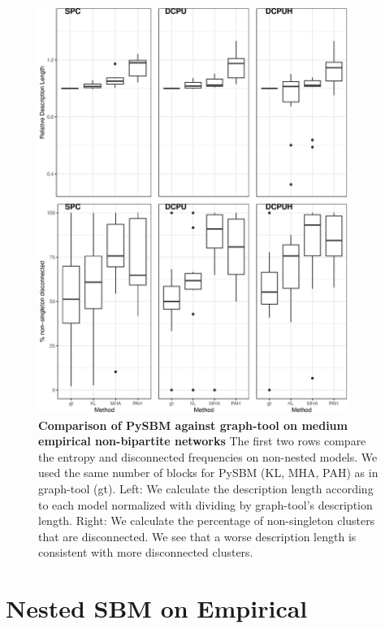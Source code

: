 \documentclass[aps,pre,superscriptaddress]{article}
\begin{document}
\begin{figure}[!htpb]
	\centering
	\includegraphics[width=0.9\textwidth]{figures/pysbm_v_graph_tool_flat.eps}
	\caption[]{
		\textbf{Comparison of PySBM against graph-tool on medium empirical non-bipartite networks}
		The first two rows compare the entropy and disconnected frequencies on non-nested models. %
		We used the same number of blocks for PySBM (KL, MHA, PAH) as in graph-tool (gt). %
		Left: We calculate the description length according to each model normalized with dividing by graph-tool's description length. 
		Right: We calculate the percentage of non-singleton clusters that are disconnected.
		We see that a worse description length is consistent with more disconnected clusters.
	}
	\label{fig:comparison_flat.pdf}
\end{figure}

\clearpage
\section{Nested SBM on Empirical}
\end{document}
